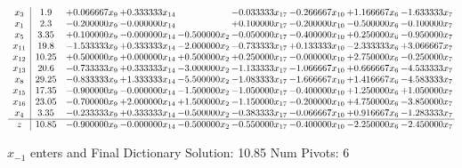 \documentclass[10pt]{article}
\begin{document}
 \[\begin{array}{c| c c@{\hskip 2pt} c@{\hskip 2pt} c@{\hskip 2pt} c@{\hskip 2pt} c@{\hskip 2pt} c@{\hskip 2pt} c@{\hskip 2pt} }
 x_{3}   &  1.9 & + 0.066667 x_{9} & + 0.333333 x_{14} &   & -0.033333 x_{17} & -0.266667 x_{10} & + 1.166667 x_{6} & -1.633333 x_{7}\\
 x_{1}   &  2.3 & -0.200000 x_{9} & -0.000000 x_{14} &   & + 0.100000 x_{17} & -0.200000 x_{10} & -0.500000 x_{6} & -0.100000 x_{7}\\
 x_{5}   &  3.35 & + 0.100000 x_{9} & -0.000000 x_{14} & -0.500000 x_{2} & -0.050000 x_{17} & -0.400000 x_{10} & + 0.250000 x_{6} & -0.950000 x_{7}\\
 x_{11}   &  19.8 & -1.533333 x_{9} & + 0.333333 x_{14} & -2.000000 x_{2} & -0.733333 x_{17} & + 0.133333 x_{10} & -2.333333 x_{6} & + 3.066667 x_{7}\\
 x_{12}   &  10.25 & + 0.500000 x_{9} & + 0.000000 x_{14} & + 0.500000 x_{2} & + 0.250000 x_{17} & -0.000000 x_{10} & + 2.750000 x_{6} & -0.250000 x_{7}\\
 x_{13}   &  20.6 & -0.733333 x_{9} & + 0.333333 x_{14} & -3.000000 x_{2} & -1.133333 x_{17} & -1.066667 x_{10} & + 0.666667 x_{6} & -4.533333 x_{7}\\
 x_{8}   &  29.25 & -0.833333 x_{9} & + 1.333333 x_{14} & -5.500000 x_{2} & -1.083333 x_{17} & -1.666667 x_{10} & + 1.416667 x_{6} & -4.583333 x_{7}\\
 x_{15}   &  17.35 & -0.900000 x_{9} & -0.000000 x_{14} & -1.500000 x_{2} & -1.050000 x_{17} & -0.400000 x_{10} & + 1.250000 x_{6} & + 1.050000 x_{7}\\
 x_{16}   &  23.05 & -0.700000 x_{9} & + 2.000000 x_{14} & + 1.500000 x_{2} & -1.150000 x_{17} & -0.200000 x_{10} & + 4.750000 x_{6} & -3.850000 x_{7}\\
 x_{4}   &  3.35 & -0.233333 x_{9} & + 0.333333 x_{14} & -0.500000 x_{2} & -0.383333 x_{17} & -0.066667 x_{10} & + 0.916667 x_{6} & -1.283333 x_{7}\\
\hline
z    &  10.85 & -0.900000 x_{9} & -0.000000 x_{14} & -0.500000 x_{2} & -0.550000 x_{17} & -0.400000 x_{10} & -2.250000 x_{6} & -2.450000 x_{7}\\
\end{array}\]


 $ x_{-1} $ enters and Final Dictionary
Solution:  10.85
Num Pivots:  6
\end{document}
